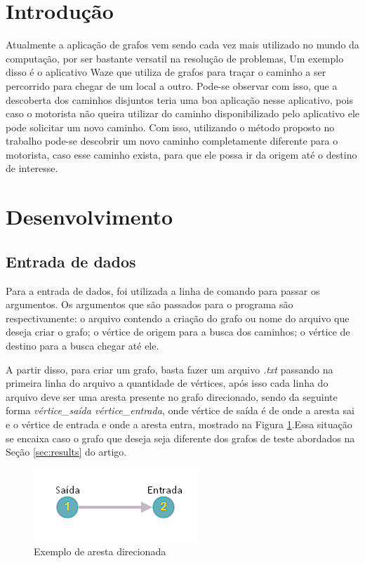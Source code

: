 \section{Introdução}
Atualmente a aplicação de grafos vem sendo cada vez mais utilizado no mundo da computação, por ser bastante versatil na resolução de problemas, Um exemplo disso é o aplicativo Waze que utiliza de grafos para traçar o caminho a ser percorrido para chegar de um local a outro. Pode-se observar com isso, que a descoberta dos caminhos disjuntos teria uma boa aplicação nesse aplicativo, pois caso o motorista não queira utilizar do caminho disponibilizado pelo aplicativo ele pode solicitar um novo caminho. Com isso, utilizando o método proposto no trabalho pode-se descobrir um novo caminho completamente diferente para o motorista, caso esse caminho exista, para que ele possa ir da origem até o destino de interesse.

\section{Desenvolvimento}

\subsection{Entrada de dados}
Para a entrada de dados, foi utilizada a linha de comando para passar os argumentos. Os argumentos que são passados para o programa são respectivamente: o arquivo contendo a criação do grafo ou nome do arquivo que deseja criar o grafo; o vértice de origem para a busca dos caminhos; o vértice de destino para a busca chegar até ele.

A partir disso, para criar um grafo, basta fazer um arquivo \emph{.txt} passando na primeira linha do arquivo a quantidade de vértices, após isso cada linha do arquivo deve ser uma aresta presente no grafo direcionado, sendo da seguinte forma \emph{vértice\_saída vértice\_entrada}, onde vértice de saída é de onde a aresta sai e o vértice de entrada e onde a aresta entra, mostrado na Figura \ref{fig:figure1}.Essa situação se encaixa caso o grafo que deseja seja diferente dos grafos de teste abordados na Seção \ref{sec:results} do artigo.

\begin{figure}[ht]
    \centering
    \includegraphics[width=.3\textwidth]{figuras/aresta_example.png}
    \caption{Exemplo de aresta direcionada}
    \label{fig:figure1}
\end{figure}

